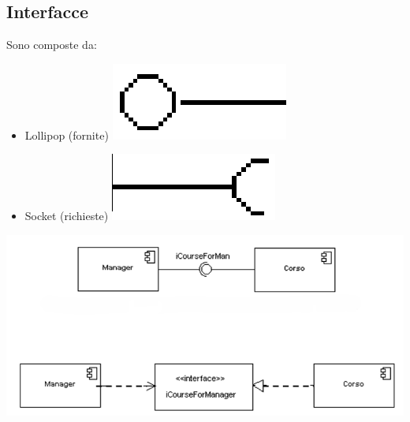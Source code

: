 \documentclass[12pt, a4paper]{report}
\begin{document}
\subsection{Interfacce}
\begin{minipage}
    {.4\textwidth}
    Sono composte da:
    \begin{itemize}
        \item Lollipop (fornite) \includegraphics[height=2\fontcharht\font`\B]{Immagini/lollipopInterface.png}
        \item Socket (richieste) \includegraphics[height=2\fontcharht\font`\B]{Immagini/socketInterface.png}
    \end{itemize}
\end{minipage}
\begin{minipage}
    {.5\textwidth}
    \begin{center}
        \includegraphics[width=\textwidth]{Immagini/interface.png}
    \end{center}
\end{minipage}
\end{document}
